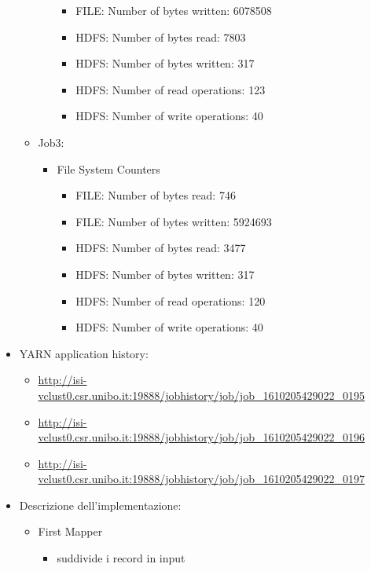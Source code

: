 \documentclass[10pt]{article}
\begin{document}
\begin{itemize}
\begin{itemize}
\begin{itemize}
\begin{itemize}
            \item FILE: Number of bytes written: 6078508
            \item HDFS: Number of bytes read: 7803
            \item HDFS: Number of bytes written: 317
            \item HDFS: Number of read operations: 123
            \item HDFS: Number of write operations: 40
        \end{itemize}
        \end{itemize}
        \item Job3:
        \begin{itemize}
        \item File System Counters
        \begin{itemize}
            \item FILE: Number of bytes read: 746
            \item FILE: Number of bytes written: 5924693
            \item HDFS: Number of bytes read: 3477
            \item HDFS: Number of bytes written: 317
            \item HDFS: Number of read operations: 120
            \item HDFS: Number of write operations: 40
        \end{itemize}
        \end{itemize}
    \end{itemize}
    \item YARN application history:
        \begin{itemize}
            \item \url{http://isi-vclust0.csr.unibo.it:19888/jobhistory/job/job_1610205429022_0195}
            \item \url{http://isi-vclust0.csr.unibo.it:19888/jobhistory/job/job_1610205429022_0196}
            \item \url{http://isi-vclust0.csr.unibo.it:19888/jobhistory/job/job_1610205429022_0197}
        \end{itemize}
    \item Descrizione dell'implementazione:
        \begin{itemize}
            \item First Mapper
                \begin{itemize}
                    \item suddivide i record in input

\end{itemize}
\end{itemize}
\end{itemize}
\end{document}
